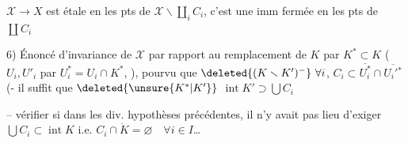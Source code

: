 $\mathcal X\longrightarrow X$ est étale en les pts de $\mathcal X\smallsetminus\coprod_i C_i$, c'est une imm fermée en les pts de $\coprod C_i$

6) Énoncé d'invariance de $\mathcal X$ par rapport au remplacement de $K$ par $K^*\subset K$ ($U_i,U'_i$ par $U_i^*=U_i\cap K^*$, ), pourvu que
  $\deleted{(K\smallsetminus K')^{-}}\ \forall i$, $C_i\subset\overline{U_i^*}\cap\overline{U_i'{}^*}$ (- il suffit que $\deleted{\unsure{K^*|K'}}$ $\operatorname{int}K'\supset\bigcup C_i$

-- vérifier si dans les div. hypothèses précédentes, il n'y avait pas lieu d'exiger $\bigcup C_i\subset\operatorname{int}K$ i.e. $C_i\cap\dot K=\varnothing\quad\forall i\in I$\ldots
{}
